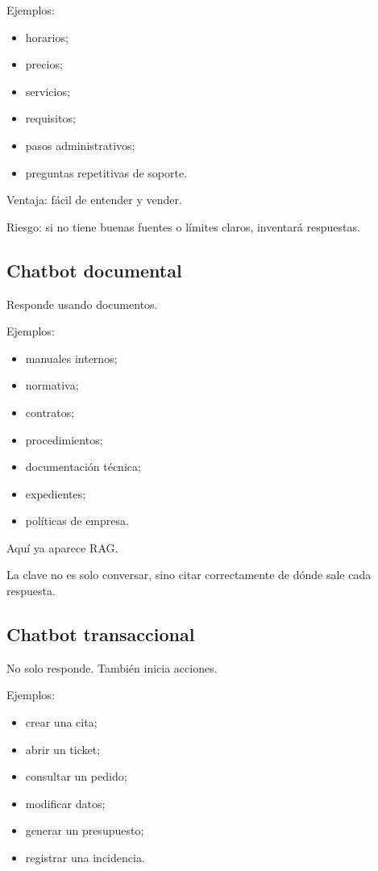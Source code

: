 Ejemplos:

\begin{itemize}
\tightlist
\item
  horarios;
\item
  precios;
\item
  servicios;
\item
  requisitos;
\item
  pasos administrativos;
\item
  preguntas repetitivas de soporte.
\end{itemize}

Ventaja: fácil de entender y vender.

Riesgo: si no tiene buenas fuentes o límites claros, inventará
respuestas.

\subsection{Chatbot documental}\label{chatbot-documental}

Responde usando documentos.

Ejemplos:

\begin{itemize}
\tightlist
\item
  manuales internos;
\item
  normativa;
\item
  contratos;
\item
  procedimientos;
\item
  documentación técnica;
\item
  expedientes;
\item
  políticas de empresa.
\end{itemize}

Aquí ya aparece RAG.

La clave no es solo conversar, sino citar correctamente de dónde sale
cada respuesta.

\subsection{Chatbot transaccional}\label{chatbot-transaccional}

No solo responde. También inicia acciones.

Ejemplos:

\begin{itemize}
\tightlist
\item
  crear una cita;
\item
  abrir un ticket;
\item
  consultar un pedido;
\item
  modificar datos;
\item
  generar un presupuesto;
\item
  registrar una incidencia.
\end{itemize}

